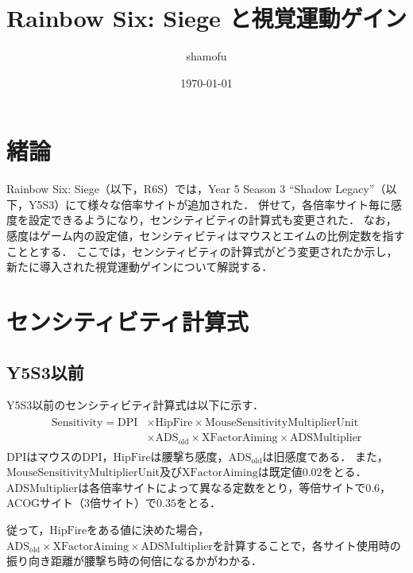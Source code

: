 \documentclass[uplatex, dvipdfmx, ja=standard, a4paper]{bxjsarticle}
\title{Rainbow Six: Siege と視覚運動ゲイン}
\author{shamofu}
\date{\today}
\begin{document}
\maketitle

\section{緒論}
Rainbow Six: Siege（以下，R6S）では，Year 5 Season 3 ``Shadow Legacy''（以下，Y5S3）にて様々な倍率サイトが追加された．
併せて，各倍率サイト毎に感度を設定できるようになり，センシティビティの計算式も変更された．
なお，感度はゲーム内の設定値，センシティビティはマウスとエイムの比例定数を指すこととする．
ここでは，センシティビティの計算式がどう変更されたか示し，新たに導入された視覚運動ゲインについて解説する．

\section{センシティビティ計算式}
\subsection{Y5S3以前}
Y5S3以前のセンシティビティ計算式は以下に示す．
\begin{align}
  \begin{split}
    \mathrm{Sensitivity} = \mathrm{DPI} &\times \mathrm{HipFire} \times \mathrm{MouseSensitivityMultiplierUnit} \\
    &\times \mathrm{ADS}_{\mathrm{old}} \times \mathrm{XFactorAiming} \times \mathrm{ADSMultiplier}
  \end{split}
  \label{oldsensi}
\end{align}
\(\mathrm{DPI}\)はマウスのDPI，\(\mathrm{HipFire}\)は腰撃ち感度，\(\mathrm{ADS}_{\mathrm{old}}\)は旧感度である．
また，\(\mathrm{MouseSensitivityMultiplierUnit}\)及び\(\mathrm{XFactorAiming}\)は既定値\(0.02\)をとる．
\(\mathrm{ADSMultiplier}\)は各倍率サイトによって異なる定数をとり，等倍サイトで\(0.6\)，ACOGサイト（3倍サイト）で\(0.35\)をとる．

従って，\(\mathrm{HipFire}\)をある値に決めた場合，\(\mathrm{ADS}_{\mathrm{old}} \times \mathrm{XFactorAiming} \times \mathrm{ADSMultiplier}\)を計算することで，各サイト使用時の振り向き距離が腰撃ち時の何倍になるかがわかる．
\end{document}
